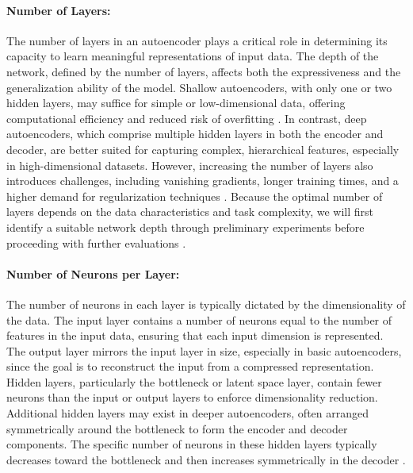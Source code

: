 \paragraph{Number of Layers:} The number of layers in an autoencoder plays a critical role in determining its capacity to learn meaningful representations of input data. The depth of the network, defined by the number of layers, affects both the expressiveness and the generalization ability of the model. Shallow autoencoders, with only one or two hidden layers, may suffice for simple or low-dimensional data, offering computational efficiency and reduced risk of overfitting \cite{Berahmand24}. In contrast, deep autoencoders, which comprise multiple hidden layers in both the encoder and decoder, are better suited for capturing complex, hierarchical features, especially in high-dimensional datasets. However, increasing the number of layers also introduces challenges, including vanishing gradients, longer training times, and a higher demand for regularization techniques \cite{Charte18}. Because the optimal number of layers depends on the data characteristics and task complexity, we will first identify a suitable network depth through preliminary experiments before proceeding with further evaluations \cite{Goodfellow16}.

\paragraph{Number of Neurons per Layer:} The number of neurons in each layer is typically dictated by the dimensionality of the data. The input layer contains a number of neurons equal to the number of features in the input data, ensuring that each input dimension is represented. The output layer mirrors the input layer in size, especially in basic autoencoders, since the goal is to reconstruct the input from a compressed representation. Hidden layers, particularly the bottleneck or latent space layer, contain fewer neurons than the input or output layers to enforce dimensionality reduction. Additional hidden layers may exist in deeper autoencoders, often arranged symmetrically around the bottleneck to form the encoder and decoder components. The specific number of neurons in these hidden layers typically decreases toward the bottleneck and then increases symmetrically in the decoder \cite{Charte18}.

